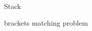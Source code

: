 \begin{frame}{}
  \centerline{\Large Stack}
\end{frame}

\begin{frame}{}
\end{frame}

\begin{frame}{}
  brackets matching problem
\end{frame}
